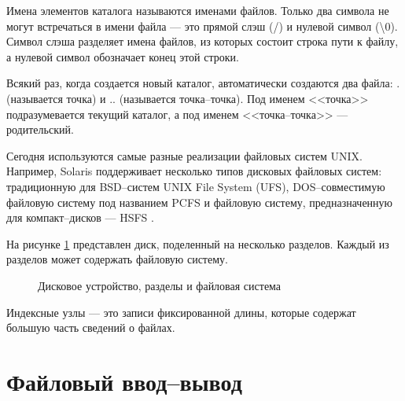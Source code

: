 Имена элементов каталога называются именами файлов. Только два символа не могут встречаться в имени файла --- это прямой слэш (/) и нулевой символ (\textbackslash 0). Символ слэша разделяет имена файлов, из которых состоит строка пути к файлу, а нулевой символ обозначает конец этой строки.

Всякий раз, когда создается новый каталог, автоматически создаются два файла: . (называется точка) и .. (называется точка--точка). Под именем <<точка>> подразумевается текущий каталог, а под именем <<точка--точка>> --- родительский. 

Сегодня используются самые разные реализации файловых систем UNIX. Например, Solaris поддерживает несколько типов дисковых файловых систем: традиционную для BSD--систем UNIX File System (UFS), DOS--совместимую файловую систему под названием PCFS и файловую систему, предназначенную для компакт--дисков --- HSFS \cite{stiven}. 

На рисунке \ref{fig:fs} представлен диск, поделенный на несколько разделов. Каждый из разделов может содержать файловую систему. 

\clearpage

\begin{figure}[ph!]
	\caption{Дисковое устройство, разделы и файловая система}
	\label{fig:fs}
\end{figure}

Индексные узлы --- это записи фиксированной длины, которые содержат большую часть сведений о файлах.


\section{Файловый ввод--вывод}


